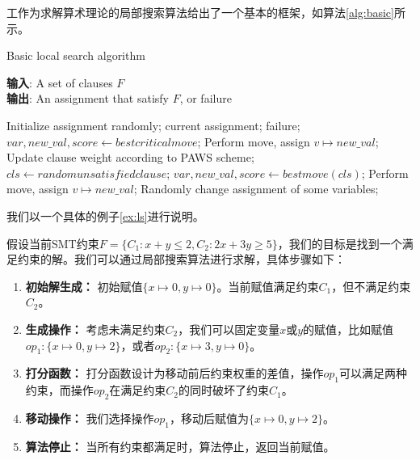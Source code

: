 工作\cite{CaiLZ2023}为求解算术理论的局部搜索算法给出了一个基本的框架，如算法\ref{alg:basic}所示。

\begin{algorithm}[t]
    \caption{Basic local search algorithm}
    \label{alg:basic}
    \textbf{输入}: A set of clauses $F$\\
    \textbf{输出}: An assignment that satisfy $F$, or failure\\
    
    \begin{algorithmic}[1] %
        \Statex \hrulefill
        \STATE Initialize assignment randomly;
        \While{\top}
                \RETURN current assignment;
            \ENDIF
                \RETURN failure;
            \ENDIF
            \STATE $var, new\_val, score \leftarrow best critical move$;
                Perform move, assign $v \mapsto new\_val$;
            \ELSE
                \STATE Update clause weight according to PAWS scheme;
                \STATE $cls \leftarrow random unsatisfied clause$;
                \STATE $var, new\_val, score \leftarrow best move(cls)$;
                    Perform move, assign $v \mapsto new\_val$;
                \ENDIF
                \STATE Randomly change assignment of some variables;
                \ENDIF
            \ENDIF
        \EndWhile
    \end{algorithmic}
\end{algorithm}

我们以一个具体的例子\ref{ex:ls}进行说明。
\begin{example}
    假设当前SMT约束$F = \{C_1: x + y \leq 2, C_2: 2x + 3y \geq 5\}$，我们的目标是找到一个满足约束的解。我们可以通过局部搜索算法进行求解，具体步骤如下：

    \begin{enumerate}
        \item \textbf{初始解生成：} 初始赋值$\{x \mapsto 0, y \mapsto 0\}$。当前赋值满足约束$C_1$，但不满足约束$C_2$。
        \item \textbf{生成操作：} 考虑未满足约束$C_2$，我们可以固定变量$x$或$y$的赋值，比如赋值$op_1: \{x \mapsto 0, y \mapsto 2\}$，或者$op_2: \{x \mapsto 3, y \mapsto 0\}$。
        \item \textbf{打分函数：} 打分函数设计为移动前后约束权重的差值，操作$op_1$可以满足两种约束，而操作$op_2$在满足约束$C_2$的同时破坏了约束$C_1$。
        \item \textbf{移动操作：} 我们选择操作$op_1$，移动后赋值为$\{x \mapsto 0, y \mapsto 2\}$。
        \item \textbf{算法停止：} 当所有约束都满足时，算法停止，返回当前赋值。
    \end{enumerate}
\label{ex:ls}
\end{example}


